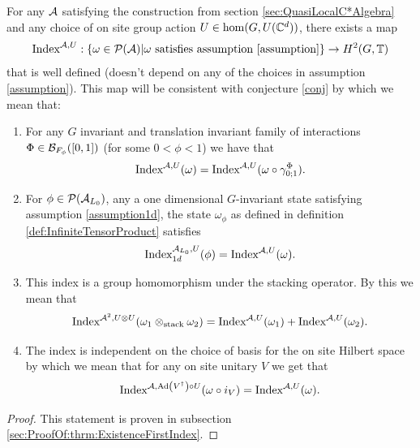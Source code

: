 \documentclass[12pt,a4paper,twoside]{article}
\numberwithin{equation}{section}
\begin{document}
\begin{theorem}\label{thrm:ExistenceFirstIndex}
	For any $\AA$ satisfying the construction from section \ref{sec:QuasiLocalC*Algebra} and any choice of on site group action $U\in\hom(G,U(\CC^d))$, there exists a map
	\begin{equation}
		\textrm{Index}^{\AA,U}:\{\omega\in\PP(\AA)|\omega\text{ satisfies assumption \ref{assumption}}\}\rightarrow H^2(G,\TT)
	\end{equation}
	that is well defined (doesn't depend on any of the choices in assumption \ref{assumption}). This map will be consistent with conjecture \ref{conj} by which we mean that:
	\begin{enumerate}
		\item For any $G$ invariant and translation invariant family of interactions $\Phi\in\BB_{F_{\phi}}([0,1])$ (for some $0<\phi<1$) we have that
		\begin{equation}
			\textrm{Index}^{\AA,U}(\omega)=\textrm{Index}^{\AA,U}(\omega\circ\gamma^{\Phi}_{0;1}).
		\end{equation}
		\item For $\phi\in\PP(\AA_{L_0})$, any a one dimensional $G$-invariant state satisfying assumption \ref{assumption1d}, the state $\omega_\phi$ as defined in definition \ref{def:InfiniteTensorProduct} satisfies
		\begin{equation}
			\textrm{Index}^{\AA_{L_0},U}_{1d}(\phi)=\textrm{Index}^{\AA,U}(\omega).
		\end{equation}
		\item This index is a group homomorphism under the stacking operator. By this we mean that
		\begin{equation}
			\textrm{Index}^{\AA^2,U\otimes U}(\omega_1\otimes_{\text{stack}}\omega_2)=\textrm{Index}^{\AA,U}(\omega_1)+\textrm{Index}^{\AA,U}(\omega_2).
		\end{equation}
		\item The index is independent on the choice of basis for the on site Hilbert space by which we mean that for any on site unitary $V$ we get that
		\begin{equation}
			\textrm{Index}^{\AA,\Ad{V^\dagger}\circ U}(\omega\circ i_V)=\textrm{Index}^{\AA,U}(\omega).
		\end{equation}
	\end{enumerate}
\end{theorem}
\begin{proof}
	This statement is proven in subsection \ref{sec:ProofOf:thrm:ExistenceFirstIndex}.
\end{proof}
\end{document}
